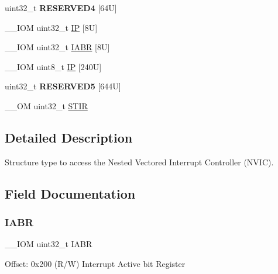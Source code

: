 \begin{DoxyCompactItemize}
\item 
\mbox{\label{struct_n_v_i_c___type_aba051916995cac44d084f98e03710def}} 
uint32\+\_\+t {\bfseries R\+E\+S\+E\+R\+V\+E\+D4} \mbox{[}64\+U\mbox{]}
\item 
\+\_\+\+\_\+\+I\+OM uint32\+\_\+t \mbox{\hyperlink{struct_n_v_i_c___type_a1787506107747d2dedae05295d3532da}{IP}} \mbox{[}8\+U\mbox{]}
\item 
\+\_\+\+\_\+\+I\+OM uint32\+\_\+t \mbox{\hyperlink{struct_n_v_i_c___type_a9dbbeff4da41df476f0718c3ce11ab89}{I\+A\+BR}} \mbox{[}8\+U\mbox{]}
\item 
\+\_\+\+\_\+\+I\+OM uint8\+\_\+t \mbox{\hyperlink{struct_n_v_i_c___type_a4fda947a8fd3237a89d43b7d5a1057cb}{IP}} \mbox{[}240\+U\mbox{]}
\item 
\mbox{\label{struct_n_v_i_c___type_ab94befc6cb8470a5e871cf2c99cb7a6e}} 
uint32\+\_\+t {\bfseries R\+E\+S\+E\+R\+V\+E\+D5} \mbox{[}644\+U\mbox{]}
\item 
\+\_\+\+\_\+\+OM uint32\+\_\+t \mbox{\hyperlink{struct_n_v_i_c___type_ada9cbba14ab1cc3fddd585f870932db8}{S\+T\+IR}}
\end{DoxyCompactItemize}


\subsection{Detailed Description}
Structure type to access the Nested Vectored Interrupt Controller (N\+V\+IC). 

\subsection{Field Documentation}
\mbox{\label{struct_n_v_i_c___type_a9dbbeff4da41df476f0718c3ce11ab89}} 
\subsubsection{\texorpdfstring{I\+A\+BR}{IABR}}
{\footnotesize\ttfamily \+\_\+\+\_\+\+I\+OM uint32\+\_\+t I\+A\+BR}

Offset\+: 0x200 (R/W) Interrupt Active bit Register \mbox{\label{struct_n_v_i_c___type_a3617ee583e4154c0a5901c6965020da9}} 
